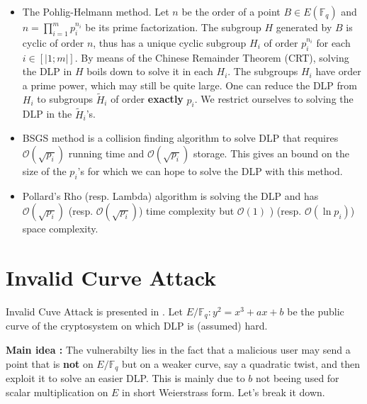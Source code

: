 \documentclass[10pt]{article}
\theoremstyle{definition}
\newcommand{\F}{\mathbb{F}}
\begin{document}
\begin{itemize}
\item The Pohlig-Helmann method.
Let $n$ be the order of a point $B \in E(\F_q)$ and  $n = \prod_{i = 1}^m p_i^{n_i}$ be its prime factorization.
The subgroup $H$ generated by $B$ is cyclic of order $n$, thus has a unique cyclic subgroup $H_i$ of order $p_i^{n_i}$ for each $i \in [| 1; m|]$.
By means of the Chinese Remainder Theorem (CRT), solving the DLP in $H$ boils down to solve it in each $H_i$. 
The subgroups $H_i$ have order a prime power, which may still be quite large. 
One can reduce the DLP from $H_i$ to subgroups $\tilde{H}_i$ of order \textbf{exactly} $p_i$.
We restrict ourselves to solving the DLP in the $\tilde{H}_i$'s.
\item BSGS method is a collision finding algorithm to solve DLP that requires $\mathcal{O}(\sqrt{p_i})$ running time and $\mathcal{O}(\sqrt{p_i})$ storage.
This gives an bound on the size of the $p_i$'s for which we can hope to solve the DLP with this method.
\item Pollard's Rho (resp. Lambda) algorithm is solving the DLP and has $\mathcal{O}(\sqrt{p_i})$ (resp. $\mathcal{O}(\sqrt{p_i})$) time complexity but $\mathcal{O}(1)$ ) (resp. $\mathcal{O}(\ln{p_i})$) space complexity.
\end{itemize}

\section{Invalid Curve Attack}

Invalid Cuve Attack is presented in \cite{FLRV08}.
Let $E/\F_q : y^2 = x^3+ax+b$ be the public curve of the cryptosystem on which DLP is (assumed) hard.

\vspace*{.5cm}
\textbf{Main idea :} The vulnerabilty lies in the fact that a malicious user may send a point that is \textbf{not} on $E/\F_q$ but on a weaker curve, say a quadratic twist, and then exploit it to solve an easier DLP.
This is mainly due to $b$ not beeing used for scalar multiplication on $E$ in short Weierstrass form.
Let's break it down.
\end{document}
